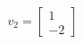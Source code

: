 \documentclass{article}
\begin{document}
\begin{align*}
v_2 = \begin{bmatrix}1\\-2\end{bmatrix}
\end{align*}
\end{document}
